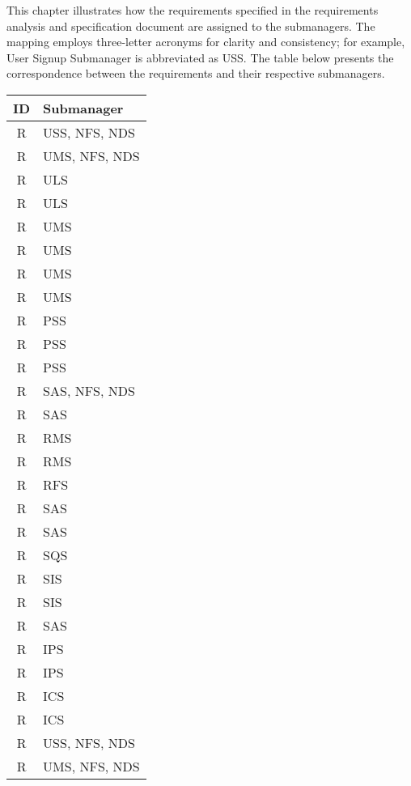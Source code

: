 This chapter illustrates how the requirements specified in the requirements analysis and specification document \cite{carraracurrodossi2024} are assigned to the submanagers.
The mapping employs three-letter acronyms for clarity and consistency; for example, User Signup Submanager is abbreviated as USS.
The table below presents the correspondence between the requirements and their respective submanagers.

\setcounter{r}{1}
\newcommand{\rc}{\ther\stepcounter{r}}
\renewcommand{\arraystretch}{1.5}
\begin{longtable}{|c|p{10.5cm}|}
    \hline \rowcolor{polimiblue!40}
    \textbf{ID} & \textbf{Submanager} \\ \hline
    R\rc & USS, NFS, NDS \\ \hline
    R\rc & UMS, NFS, NDS \\ \hline
    R\rc & ULS \\ \hline
    R\rc & ULS \\ \hline
    R\rc & UMS \\ \hline
    R\rc & UMS \\ \hline
    R\rc & UMS \\ \hline
    R\rc & UMS \\ \hline
    R\rc & PSS \\ \hline
    R\rc & PSS \\ \hline
    R\rc & PSS \\ \hline
    R\rc & SAS, NFS, NDS \\ \hline
    R\rc & SAS \\ \hline
    R\rc & RMS \\ \hline
    R\rc & RMS \\ \hline
    R\rc & RFS \\ \hline
    R\rc & SAS \\ \hline
    R\rc & SAS \\ \hline
    R\rc & SQS \\ \hline
    R\rc & SIS \\ \hline
    R\rc & SIS \\ \hline
    R\rc & SAS \\ \hline
    R\rc & IPS \\ \hline
    R\rc & IPS \\ \hline
    R\rc & ICS \\ \hline
    R\rc & ICS \\ \hline
    R\rc & USS, NFS, NDS \\ \hline
    R\rc & UMS, NFS, NDS \\ \hline

\end{longtable}
